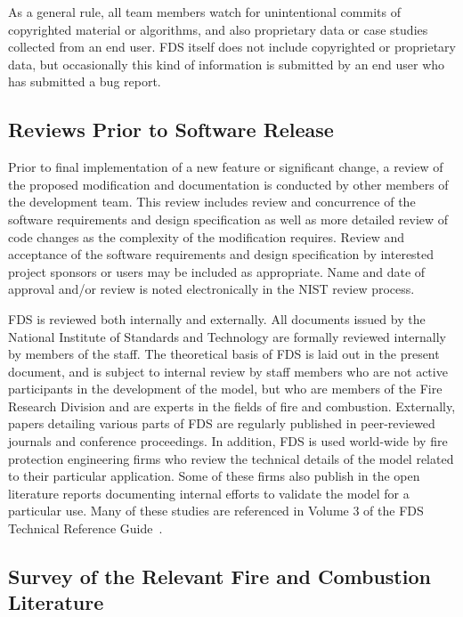 \documentclass[11pt]{book}
\begin{document}
As a general rule, all team members watch for unintentional commits of copyrighted material or algorithms, and also proprietary data or case studies collected from an end user. FDS itself does not include copyrighted or proprietary data, but occasionally this kind of information is submitted by an end user who has submitted a bug report.

\subsection{Reviews Prior to Software Release}

Prior to final implementation of a new feature or significant change, a review of the proposed modification and documentation is conducted by other members of the development team.  This review includes review and concurrence of the software requirements and design specification as well as more detailed review of code changes as the complexity of the modification requires. Review and acceptance of the software requirements and design specification by interested project sponsors or users may be included as appropriate. Name and date of approval and/or review is noted electronically in the NIST review process.

FDS is reviewed both internally and externally. All documents issued by the National Institute of Standards and Technology are formally reviewed internally by members of the staff. The theoretical basis of FDS is laid out in the present document, and is subject to internal review by staff members who are not active participants in the development of the model, but who are members of the Fire Research Division and are experts in the fields of fire and combustion. Externally, papers detailing various parts of FDS are regularly published in peer-reviewed journals and conference proceedings. In addition, FDS is used world-wide by fire protection engineering firms who review the technical details of the model related to their particular application. Some of these firms also publish in the open literature reports documenting internal efforts to validate the model for a particular use. Many of these studies are referenced in Volume 3 of the FDS Technical Reference Guide~\cite{FDS_Tech_Guide}.

\subsection{Survey of the Relevant Fire and Combustion Literature}

\label{Relevantdocs}
\end{document}

